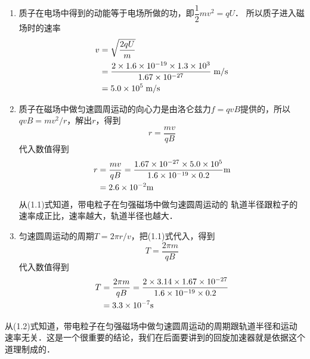 \begin{solution}
    \begin{enumerate}
        \item 质子在电场中得到的动能等于电场所做的功，即$\dfrac{1}{2}mv^2=qU$．
        所以质子进入磁场时的速率
        \[\begin{split}
            v&=\sqrt{\frac{2qU}{m}}\\
            &=\frac{2\times 1.6\times 10^{-19}\times1.3\times10^3}{1.67\times 10^{-27}}\;\text{m}/\text{s}\\
            &=5.0\times 10^5\;\text{m}/\text{s}
        \end{split}\]
        \item 质子在磁场中做匀速圆周运动的向心力是由洛仑兹力$f=qvB$提供的，所以$qvB=mv^2/r$，解出$r$，得到
        \begin{equation}
            r=\frac{mv}{qB}
        \end{equation}
        代入数值得到
       \[\begin{split}
           r&=\frac{mv}{qB}=\frac{1.67\times 10^{-27}\times 5.0\times 10^5}{1.6\times 10^{-19}\times 0.2}{\rm m}\\
           &=2.6\times 10^{-2}{\rm m}
       \end{split}\]
        从(1.1)式知道，带电粒子在匀强磁场中做匀速圆周运动的
        轨道半径跟粒子的速率成正比，速率越大，轨道半径也越大．
        
        \item 匀速圆周运动的周期$T=2\pi r/v$，把(1.1)式代入，得到
\begin{equation}
    T=\frac{2\pi m}{qB}
\end{equation}
        代入数值得到
        \[\begin{split}
            T&=\frac{2\pi m}{qB}=\frac{2\times 3.14\times 1.67\times 10^{-27}}{1.6\times 10^{-19}\times 0.2}\\
            &=3.3\times 10^{-7}{\rm s}
        \end{split}\]
    \end{enumerate}
\end{solution}

从(1.2)式知道，带电粒子在匀强磁场中做匀速圆周运动的周期跟轨道半径和运动速率无关．这是一个很重要的结论，我们在后面要讲到的回旋加速器就是依据这个道理制成的．
        
